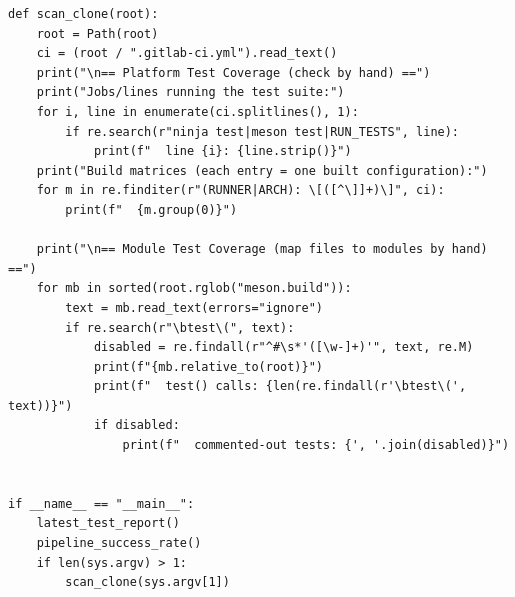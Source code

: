 \begin{lstlisting}[caption={\texttt{gimp\_testability.py}}, label={lst:script}]
def scan_clone(root):
    root = Path(root)
    ci = (root / ".gitlab-ci.yml").read_text()
    print("\n== Platform Test Coverage (check by hand) ==")
    print("Jobs/lines running the test suite:")
    for i, line in enumerate(ci.splitlines(), 1):
        if re.search(r"ninja test|meson test|RUN_TESTS", line):
            print(f"  line {i}: {line.strip()}")
    print("Build matrices (each entry = one built configuration):")
    for m in re.finditer(r"(RUNNER|ARCH): \[([^\]]+)\]", ci):
        print(f"  {m.group(0)}")

    print("\n== Module Test Coverage (map files to modules by hand) ==")
    for mb in sorted(root.rglob("meson.build")):
        text = mb.read_text(errors="ignore")
        if re.search(r"\btest\(", text):
            disabled = re.findall(r"^#\s*'([\w-]+)'", text, re.M)
            print(f"{mb.relative_to(root)}")
            print(f"  test() calls: {len(re.findall(r'\btest\(', text))}")
            if disabled:
                print(f"  commented-out tests: {', '.join(disabled)}")


if __name__ == "__main__":
    latest_test_report()
    pipeline_success_rate()
    if len(sys.argv) > 1:
        scan_clone(sys.argv[1])
\end{lstlisting}

